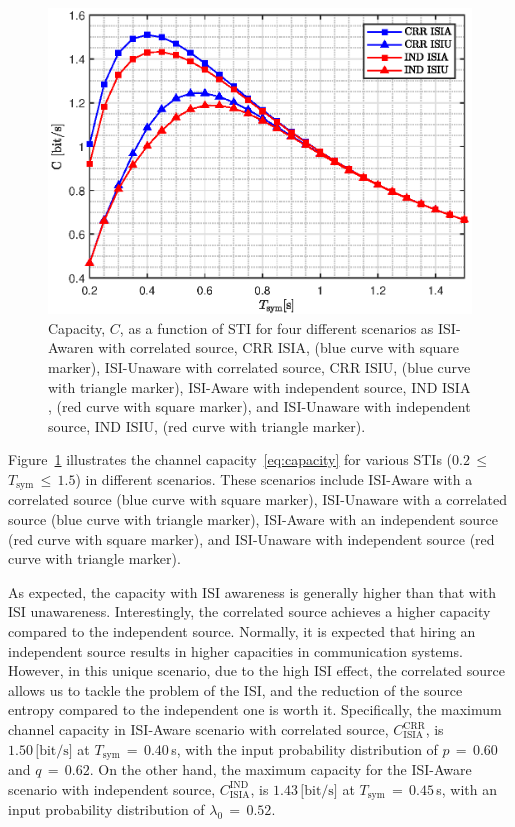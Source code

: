 \documentclass[journal]{IEEEtranTCOM}
\begin{document}
\begin{figure}
    \centering
    \includegraphics[width=1\linewidth]{Figures/OPTAIR_vs_Tsym.eps}
    \caption{ Capacity, $C$, as a function of STI for four different scenarios as ISI-Awaren with correlated source, $\text{CRR~ISIA}$, (blue curve with square marker), ISI-Unaware with correlated source, $\text{CRR~ISIU}$, (blue curve with triangle marker), ISI-Aware with independent source, $\text{IND~ISIA}$, (red curve with square marker), and ISI-Unaware with independent source, $\text{IND~ISIU}$, (red curve with triangle marker).}
    \label{fig:Capacity}
\end{figure}
\par Figure~\ref{fig:Capacity} illustrates the channel capacity~\eqref{eq:capacity} for various STIs ($0.2$$\,\leq\,$$T_{\mathrm{sym}}$$\,\leq\,$$ 1.5$) in different scenarios. These scenarios include ISI-Aware with a correlated source (blue curve with square marker), ISI-Unaware with a correlated source (blue curve with triangle marker), ISI-Aware with an independent source (red curve with square marker), and ISI-Unaware with independent source (red curve with triangle marker).

As expected, the capacity with ISI awareness is generally higher than that with ISI unawareness. Interestingly, the correlated source achieves a higher capacity compared to the independent source. Normally, it is expected that hiring an independent source results in higher capacities in communication systems. However, in this unique scenario, due to the high ISI effect, the correlated source allows us to tackle the problem of the ISI, and the reduction of the source entropy compared to the independent one is worth it. Specifically, the maximum channel capacity in ISI-Aware scenario with correlated source, $C_{\text{ISIA}}^{\text{CRR}}$, is $1.50\,\text{[bit/s]}$ at $T_{\mathrm{sym}}$$\,=\,$$0.40$\,s, with the input probability distribution of $p$$\,=\,$$0.60$ and $q$$\,=\,$$0.62$. On the other hand, the maximum capacity for the ISI-Aware scenario with independent source, $C_{\text{ISIA}}^{\text{IND}}$, is $1.43\,\text{[bit/s]}$ at $T_{\mathrm{sym}}$$\,=\,$$0.45$\,s, with an input probability distribution of $\lambda_{0}$$\,=\,$$0.52$.
\end{document}
